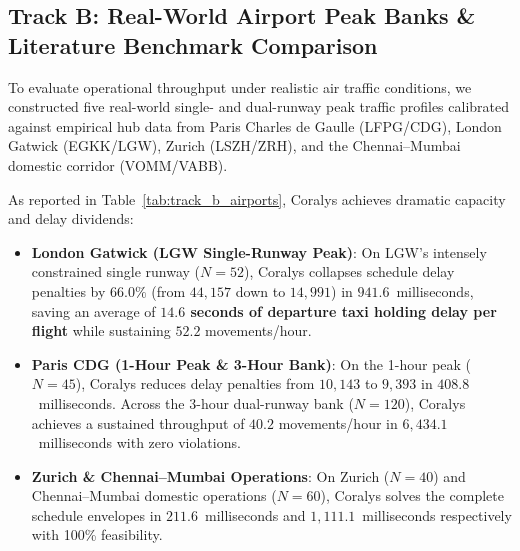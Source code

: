 \documentclass[10pt,journal,compsoc]{IEEEtran}
\begin{document}
\subsection{Track B: Real-World Airport Peak Banks \& Literature Benchmark Comparison}
To evaluate operational throughput under realistic air traffic conditions, we constructed five real-world single- and dual-runway peak traffic profiles calibrated against empirical hub data from Paris Charles de Gaulle (LFPG/CDG), London Gatwick (EGKK/LGW), Zurich (LSZH/ZRH), and the Chennai--Mumbai domestic corridor (VOMM/VABB).



As reported in Table~\ref{tab:track_b_airports}, Coralys achieves dramatic capacity and delay dividends:
\begin{itemize}
    \item \textbf{London Gatwick (LGW Single-Runway Peak)}: On LGW's intensely constrained single runway ($N=52$), Coralys collapses schedule delay penalties by \textbf{$66.0\%$} (from $44,157$ down to $14,991$) in $941.6$~milliseconds, saving an average of \textbf{$14.6$ seconds of departure taxi holding delay per flight} while sustaining $52.2$ movements/hour.
    \item \textbf{Paris CDG (1-Hour Peak \& 3-Hour Bank)}: On the 1-hour peak ($N=45$), Coralys reduces delay penalties from $10,143$ to $9,393$ in $408.8$~milliseconds. Across the 3-hour dual-runway bank ($N=120$), Coralys achieves a sustained throughput of $40.2$ movements/hour in $6,434.1$~milliseconds with zero violations.
    \item \textbf{Zurich \& Chennai--Mumbai Operations}: On Zurich ($N=40$) and Chennai--Mumbai domestic operations ($N=60$), Coralys solves the complete schedule envelopes in $211.6$~milliseconds and $1,111.1$~milliseconds respectively with 100\% feasibility.
\end{itemize}


\end{document}
